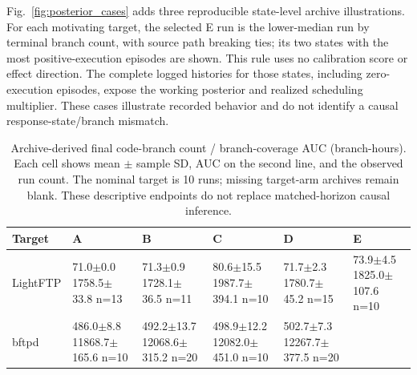 \documentclass[final,5p,times,number]{elsarticle}
\newcommand{\missing}{\mbox{}}
\newcommand{\figref}[1]{Fig.~\ref{#1}}
\begin{document}
\figref{fig:posterior_cases} adds three reproducible state-level archive illustrations. For each motivating target, the selected E run is the lower-median run by terminal branch count, with source path breaking ties; its two states with the most positive-execution episodes are shown. This rule uses no calibration score or effect direction. The complete logged histories for those states, including zero-execution episodes, expose the working posterior and realized scheduling multiplier. These cases illustrate recorded behavior and do not identify a causal response-state/branch mismatch.



\begin{table}[!tp]
\centering\small
\caption{Archive-derived final code-branch count / branch-coverage AUC (branch-hours). Each cell shows mean $\pm$ sample SD, AUC on the second line, and the observed run count. The nominal target is 10 runs; missing target-arm archives remain blank. These descriptive endpoints do not replace matched-horizon causal inference.}
\label{tab:mainresults}
\begin{tabularx}{\textwidth}{l *{5}{>{\centering\arraybackslash}X}}
\toprule
Target & A & B & C & D & E \\
\midrule
LightFTP & \shortstack{71.0$\pm$0.0\\1758.5$\pm$33.8\\n=13} & \shortstack{71.3$\pm$0.9\\1728.1$\pm$36.5\\n=11} & \shortstack{80.6$\pm$15.5\\1987.7$\pm$394.1\\n=10} & \shortstack{71.7$\pm$2.3\\1780.7$\pm$45.2\\n=15} & \shortstack{73.9$\pm$4.5\\1825.0$\pm$107.6\\n=10} \\
\addlinespace[3pt]
bftpd & \shortstack{486.0$\pm$8.8\\11868.7$\pm$165.6\\n=10} & \shortstack{492.2$\pm$13.7\\12068.6$\pm$315.2\\n=20} & \shortstack{498.9$\pm$12.2\\12082.0$\pm$451.0\\n=10} & \shortstack{502.7$\pm$7.3\\12267.7$\pm$377.5\\n=20} & \missing \\

\end{tabularx}
\end{table}
\end{document}
